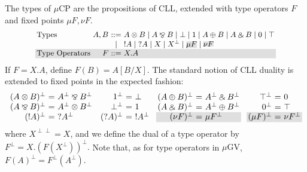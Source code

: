 \documentclass[orivec,envcountsame]{llncs}
\makeatletter
\newcommand{\with}{\mathbin\binampersand}
\newcommand{\parr}{\mathbin\bindnasrepma}
\newcommand{\cpdual}[1]{#1^\perp}
\newcommand{\cpbang}[1]{{! #1}}
\newcommand{\cpquery}[1]{{? #1}}
\newcommand{\mucp}{$\mu\mathrm{CP}$\xspace}
\newcommand{\mugv}{$\mu\mathrm{GV}$\xspace}
\newcommand{\ba}{\begin{array}}
\newcommand{\ea}{\end{array}}
\newenvironment{eqs}{\ba{@{}r@{~}c@{~}l@{}}}{\ea}
\newcommand\shade[1]{\setlength{\fboxsep}{0pt}\colorbox{shade}{\ensuremath{#1}}}
\newcommand\shaderow{\noalign{\vskip-0.4pt}\rowcolor{shade}[0.6mm]}
\makeatother
\begin{document}
The types of \mucp are the propositions of CLL, extended with type operators $F$ and fixed points
$\mu F,\nu F$.
\[\small\begin{array}{@{}l@{~}r@{~}c@{~}l@{}}
  \text{Types} & A,B & ::= & A \otimes B \mid A \parr B \mid \bot \mid 1 \mid A \oplus B \mid A \with B \mid 0 \mid \top \\
   & & \mid & \cpbang{A} \mid \cpquery{A} \mid X \mid \cpdual{X} \mid \shade{\mu F} \mid \shade{\nu F} \\ \shaderow
   \text{Type Operators} & F & ::= & X.A \\
\end{array}\]
If $F = X.A$, define $F(B) = A[B/X]$.  The standard notion of CLL duality is extended to fixed
points in the expected fashion:
\[
\ba{@{}c@{\quad}c@{\quad}c@{\quad}c@{}}
\begin{eqs}
  \cpdual{(A \otimes B)} &=& \cpdual{A} \parr \cpdual{B} \\
  \cpdual{(A \parr B)} &=& \cpdual{A} \otimes \cpdual{B} \\
  \cpdual{(\cpbang{A})} &=& \cpquery{\cpdual{A}} \\
\end{eqs}
&
\begin{eqs}
  \cpdual{1} &=& \bot \\
  \cpdual{\bot} &=& 1 \\
  \cpdual{(\cpquery{A})} &=& \cpbang{\cpdual{A}} \\
\end{eqs}
&
\begin{eqs}
  \cpdual{(A \oplus B)} &=& \cpdual{A} \with \cpdual{B} \\
  \cpdual{(A \with B)} &=& \cpdual{A} \oplus \cpdual{B} \\ \shaderow
  \cpdual{(\nu F)} &=& \mu \cpdual{F} \\
\end{eqs}
&
\begin{eqs}
  \cpdual{\top} &=& 0 \\
  \cpdual{0} &=& \top \\ \shaderow
  \cpdual{(\mu F)} &=& \nu \cpdual{F} \\
\end{eqs} \\
\ea
\]
where $X^{\perp\perp}  = X$, and we define the dual of a type operator by $\cpdual{F} =
X.\cpdual{(F(\cpdual{X}))}.$ Note that, as for type operators in \mugv, $\cpdual{F(A)} =
\cpdual{F}(\cpdual{A})$.
\end{document}
